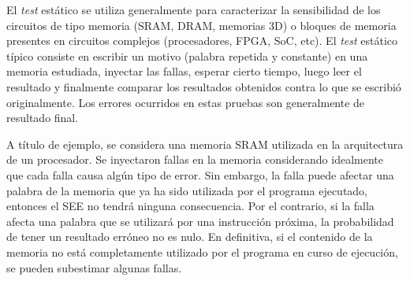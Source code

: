 \documentclass[a4paper,openright,12pt]{report}
\begin{document}
El \textit{\textit{test}} estático se  utiliza generalmente para caracterizar la sensibilidad de los circuitos de tipo memoria (SRAM, DRAM, memorias 3D) o bloques de memoria presentes en circuitos  complejos (procesadores, FPGA, SoC, etc). El \textit{test} estático típico consiste en escribir un motivo (palabra repetida y constante) en una memoria estudiada, inyectar las fallas, esperar cierto tiempo, luego leer el resultado y finalmente comparar los resultados obtenidos contra lo que se escribió originalmente. Los errores ocurridos en estas pruebas    son  generalmente de resultado final. 

A título de ejemplo, se considera una memoria SRAM utilizada en la arquitectura de un procesador. Se inyectaron fallas en la memoria considerando idealmente que cada falla causa algún tipo de error.
Sin embargo, la falla puede afectar una palabra de la memoria que  ya ha sido utilizada por el programa ejecutado, entonces el SEE no tendrá ninguna consecuencia. Por el contrario, si la falla afecta una palabra que se utilizará por una instrucción próxima, la probabilidad de tener un resultado erróneo no es  nulo. En definitiva, si el contenido de la memoria no está completamente utilizado por el programa en curso de ejecución, se pueden subestimar algunas fallas.
\end{document}
